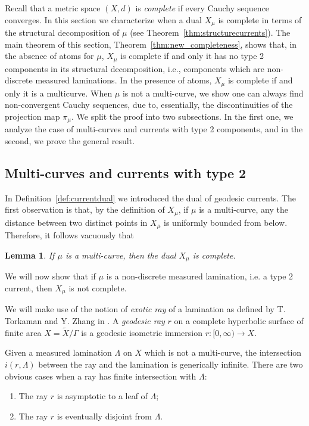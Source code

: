 \documentclass[12pt,article]{amsart}
\numberwithin{equation}{section}
\numberwithin{figure}{section}
\newtheorem{lemma}[equation]{Lemma}
\theoremstyle{definition}
\theoremstyle{plain}
\newcommand*{\wt}[1]{\widetilde{#1}}
\begin{document}
Recall that a metric space $(X,d)$ is \emph{complete} if every Cauchy sequence converges.
In this section we characterize when a dual $X_{\mu}$ is complete in terms of the structural decomposition of $\mu$ (see Theorem~\ref{thm:structurecurrents}). The main theorem of this section, Theorem~\ref{thm:new_completeness}, shows that, in the absence of atoms for $\mu$, $X_{\mu}$ is complete if and only it has no type 2 components in its structural decomposition, i.e., components which are non-discrete measured laminations.
In the presence of atoms, $X_{\mu}$ is complete if and only it is a multicurve. When $\mu$ is not a multi-curve, we show one can always find non-convergent Cauchy sequences, due to, essentially, the discontinuities of the projection map $\pi_{\mu}$.
We split the proof into two subsections. In the first one, we analyze the case of multi-curves and currents with type 2 components, and in the second, we prove the general result.

\subsection{Multi-curves and currents with type 2}
\label{subsec:measuredlam}

In Definition~\ref{def:currentdual} we introduced the dual of geodesic currents. The first observation is that, by the definition of $X_{\mu}$, if $\mu$ is a multi-curve, any the distance between two distinct points in $X_{\mu}$ is uniformly bounded from below. 
Therefore, it follows vacuously that

\begin{lemma}
If $\mu$ is a multi-curve, then the dual $X_{\mu}$ is complete.
\end{lemma}

We will now show that if $\mu$ is a non-discrete measured lamination, i.e. a type 2 current, then $X_{\mu}$ is not complete. 

We will make use of the notion of \emph{exotic ray} of a lamination as defined by T. Torkaman and Y. Zhang in \cite{TuZh21:halo}. A \emph{geodesic ray} $r$ on a complete hyperbolic surface of finite area $X = \wt{X} / \Gamma$ is a geodesic isometric immersion $r : [0, \infty ) \to X$.

Given a measured lamination $\Lambda$ on $X$ which is not a multi-curve, the intersection $i (r, \Lambda)$ between the ray and the lamination is generically infinite. There are two obvious cases when a ray has finite intersection with $\Lambda$:
\begin{enumerate}
    \item The ray $r$ is asymptotic to a leaf of $\Lambda$;
    \item The ray $r$ is eventually disjoint from $\Lambda$.
\end{enumerate}
\end{document}
